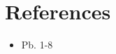 \documentclass{exam}
\begin{document}
\section*{References}
\begin{itemize}
   \item Pb. 1-8 \cite{cplab07}
\end{itemize}
\printbibliography[heading=none]
\end{document}

